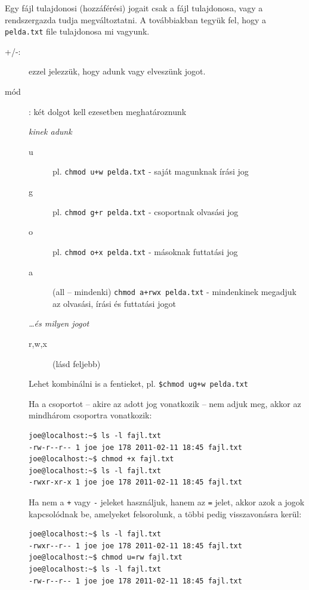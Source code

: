 Egy fájl tulajdonosi (hozzáférési) jogait csak a fájl tulajdonosa, vagy a rendszergazda tudja megváltoztatni. A továbbiakban tegyük fel, hogy a \texttt{pelda.txt} file tulajdonosa  mi vagyunk.
\begin{description}
\item[+/-:] ezzel jelezzük, hogy adunk vagy elveszünk jogot.
\item[mód]: két dolgot kell ezesetben meghatároznunk\medskip

	\textit{kinek adunk}
	\begin{description}
	\item[u] pl. \texttt{chmod u+w pelda.txt} - saját magunknak írási jog
	\item[g] pl. \texttt{chmod g+r pelda.txt} - csoportnak olvasási jog
	\item[o] pl. \texttt{chmod o+x pelda.txt} - másoknak futtatási jog
	\item[a] (all -- mindenki)  \texttt{chmod a+rwx pelda.txt} - mindenkinek megadjuk az olvasási, írási és futtatási jogot
	\end{description}
	
	\textit{\dots és milyen jogot}
	\begin{description}
	\item[r,w,x] (lásd feljebb)
	\end{description}
	
	Lehet kombinálni is a fentieket, pl. \texttt{\$chmod ug+w pelda.txt}
\bigskip
	
Ha a csoportot -- akire az adott jog vonatkozik -- nem adjuk meg, akkor az mindhárom csoportra vonatkozik:
\begin{lstlisting}
joe@localhost:~$ ls -l fajl.txt 
-rw-r--r-- 1 joe joe 178 2011-02-11 18:45 fajl.txt
joe@localhost:~$ chmod +x fajl.txt
joe@localhost:~$ ls -l fajl.txt 
-rwxr-xr-x 1 joe joe 178 2011-02-11 18:45 fajl.txt	
\end{lstlisting}


Ha nem a \verb.+. vagy \verb.-. jeleket használjuk, hanem az \verb.=. jelet, akkor azok a jogok kapcsolódnak be, amelyeket felsorolunk, a többi pedig visszavonásra kerül:

\begin{lstlisting}
joe@localhost:~$ ls -l fajl.txt 
-rwxr--r-- 1 joe joe 178 2011-02-11 18:45 fajl.txt
joe@localhost:~$ chmod u=rw fajl.txt 
joe@localhost:~$ ls -l fajl.txt 
-rw-r--r-- 1 joe joe 178 2011-02-11 18:45 fajl.txt
\end{lstlisting}



\end{description}

